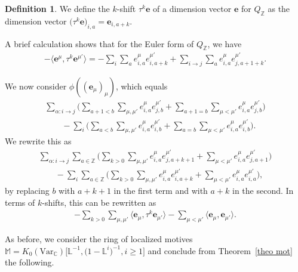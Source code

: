 \documentclass[pdftex]{sigma}
\numberwithin{equation}{section}
\theoremstyle{definition}
\newtheorem{Definition}[Theorem]{Definition}
\begin{document}
\begin{Definition}
We define the $k$-shift ${\tau}^k \mathbf{e}$ of a dimension vector $\mathbf{e}$ for $Q_\mathbb{Z}$ as the dimension vector
$
\bigl( {\tau}^k \mathbf{e}\bigr)_{i,a} = \mathbf{e}_{i,a+k} $.
\end{Definition}

A brief calculation shows that for the Euler form of $Q_\mathbb{Z}$, we have
\begin{align*}
-\big\langle\mathbf{e}^{\mu}, {\tau}^k \mathbf{e}^{\mu'}\big\rangle = - \sum_i \sum_a e_{i,a}^{\mu} e_{i, a+k}^{\mu'} + \sum_{i \rightarrow j} \sum_a e_{i,a}^{\mu} e_{j,a+1+k}^{\mu'} .
\end{align*}

We now consider $\phi((\mathbf{e}_\mu)_\mu)$, which equals
\begin{gather*}
\sum_{\alpha\colon i \rightarrow j} \biggl(\sum_{a+1 < b} \sum_{\mu, \mu'} e_{i,a}^{\mu} e_{j,b}^{\mu'} + \sum_{a+1 = b} \sum_{\mu < \mu'} e_{i,a}^{\mu} e_{j,b}^{\mu'}\biggr)\\
\qquad-\sum_{i} \biggl(\sum_{a < b} \sum_{\mu, \mu'} e_{i,a}^{\mu} e_{i,b}^{\mu'} + \sum_{a = b} \sum_{\mu < \mu'} e_{i,a}^{\mu} e_{i,b}^{\mu'}\biggr).
\end{gather*}
We rewrite this as
\begin{gather*}
\sum_{\alpha\colon i \rightarrow j} \sum_{a \in \mathbb{Z}} \biggl(\sum_{k > 0} \sum_{\mu, \mu'} e_{i,a}^{\mu} e_{j,a+k+1}^{\mu'} + \sum_{\mu < \mu'} e_{i,a}^{\mu} e_{j,a+1}^{\mu'}\biggr) \\
\qquad- \sum_{i} \sum_{a \in \mathbb{Z}} \biggl(\sum_{k > 0} \sum_{\mu, \mu'} e_{i,a}^{\mu} e_{i,a+k}^{\mu'} + \sum_{\mu < \mu'} e_{i,a}^{\mu} e_{i,a}^{\mu'}\biggr) ,
\end{gather*}
by replacing $b$ with $a+k+1$ in the first term and with $a+k$ in the second. In terms of $k$-shifts, this can be rewritten as
\begin{align*}
- \sum_{k > 0} \sum_{\mu, \mu'} \big\langle\mathbf{e}_{\mu}, {\tau}^k \mathbf{e}_{\mu'}\big\rangle - \sum_{\mu < \mu'} \langle\mathbf{e}_{\mu}, \mathbf{e}_{\mu'}\rangle.
\end{align*}

As before, we consider the ring of localized motives $ \mathbb{M} = K_0 (\text{Var}_{\mathbb{C}}) \big[\mathbb{L}^{-1}, \bigl(1- \mathbb{L}^i\bigr)^{-1}, i \geq 1\big]$ and conclude from Theorem~\ref{theo mot} the following.
\end{document}
